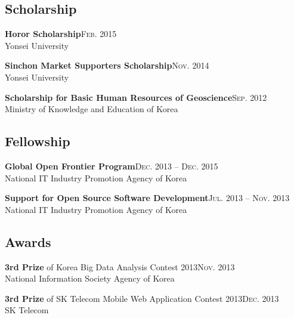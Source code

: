 \documentclass[11pt,a4paper]{article}
\renewenvironment{itemize}{
  \begin{list}{}{
    \setlength{\leftmargin}{1.5em}
    \setlength{\itemsep}{0.5em}
    \setlength{\parskip}{0pt}
    \setlength{\parsep}{0.25em}
  }
}{
  \end{list}
}
\begin{document}
\subsection*{Scholarship}
\begin{itemize}
  \item \textbf{Horor Scholarship}\hfill\textsc{Feb. 2015}\\
        Yonsei University
  \item \textbf{Sinchon Market Supporters Scholarship}\hfill\textsc{Nov. 2014}\\
        Yonsei University
  \item \textbf{Scholarship for Basic Human Resources of Geoscience}\hfill\textsc{Sep. 2012}\\
        Ministry of Knowledge and Education of Korea
\end{itemize}
\subsection*{Fellowship}
\begin{itemize}
  \item \textbf{Global Open Frontier Program}\hfill\textsc{Dec. 2013 -- Dec. 2015}\\
        National IT Industry Promotion Agency of Korea
  \item \textbf{Support for Open Source Software Development}\hfill\textsc{Jul. 2013 -- Nov. 2013}\\
        National IT Industry Promotion Agency of Korea
\end{itemize}
\subsection*{Awards}
\begin{itemize}
  \item \textbf{3rd Prize} of Korea Big Data Analysis Contest 2013\hfill\textsc{Nov. 2013}\\
        National Information Society Agency of Korea
  \item \textbf{3rd Prize} of SK Telecom Mobile Web Application Contest 2013\hfill\textsc{Dec. 2013}\\
        SK Telecom
\end{itemize}

\end{document}
